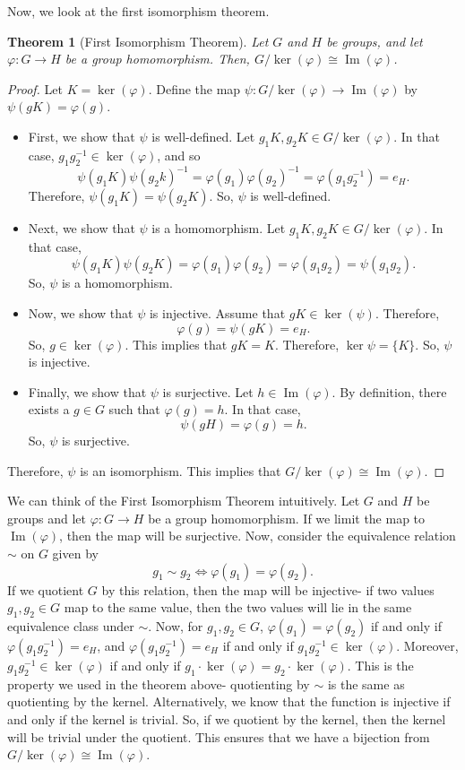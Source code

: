 \documentclass[a4paper, openany]{memoir}
\theoremstyle{definition}
\theoremstyle{plain}
\newtheorem{theorem}[definition]{Theorem}
\begin{document}
Now, we look at the first isomorphism theorem.
\begin{theorem}[First Isomorphism Theorem]
Let $G$ and $H$ be groups, and let $\varphi: G \to H$ be a group homomorphism. Then, $G/\ker (\varphi) \cong \operatorname{Im}(\varphi)$.
\end{theorem}
\begin{proof}
Let $K = \ker (\varphi)$. Define the map $\psi: G/\ker (\varphi) \to \operatorname{Im}(\varphi)$ by $\psi(gK) = \varphi(g)$. 
\begin{itemize}
    \item First, we show that $\psi$ is well-defined. Let $g_1K, g_2K \in G/\ker (\varphi)$. In that case, $g_1g_2^{-1} \in \ker (\varphi)$, and so
    \[\psi(g_1K)\psi(g_2k)^{-1} = \varphi(g_1)\varphi(g_2)^{-1} = \varphi(g_1 g_2^{-1}) = e_H.\]
    Therefore, $\psi(g_1K) = \psi(g_2K)$. So, $\psi$ is well-defined.
    \item Next, we show that $\psi$ is a homomorphism. Let $g_1K, g_2K \in G/\ker (\varphi)$. In that case,
    \[\psi(g_1K)\psi(g_2K) = \varphi(g_1) \varphi(g_2) = \varphi(g_1g_2) = \psi(g_1g_2).\]
    So, $\psi$ is a homomorphism.
    \item Now, we show that $\psi$ is injective. Assume that $gK \in \ker (\psi)$. Therefore, 
    \[\varphi(g) = \psi(gK) = e_H.\]
    So, $g \in \ker (\varphi)$. This implies that $gK = K$. Therefore, $\ker \psi = \{K\}$. So, $\psi$ is injective.
    \item Finally, we show that $\psi$ is surjective. Let $h \in \operatorname{Im}(\varphi)$. By definition, there exists a $g \in G$ such that $\varphi(g) = h$. In that case,
    \[\psi(gH) = \varphi(g) = h.\]
    So, $\psi$ is surjective.
\end{itemize}
Therefore, $\psi$ is an isomorphism. This implies that $G/\ker (\varphi) \cong \operatorname{Im}(\varphi)$.
\end{proof}
\noindent We can think of the First Isomorphism Theorem intuitively. Let $G$ and $H$ be groups and let $\varphi: G \to H$ be a group homomorphism. If we limit the map to $\operatorname{Im}(\varphi)$, then the map will be surjective. Now, consider the equivalence relation $\sim$ on $G$ given by
\[g_1 \sim g_2 \iff \varphi(g_1) = \varphi(g_2).\]
If we quotient $G$ by this relation, then the map will be injective- if two values $g_1, g_2 \in G$ map to the same value, then the two values will lie in the same equivalence class under $\sim$. Now, for $g_1, g_2 \in G$, $\varphi(g_1) = \varphi(g_2)$ if and only if $\varphi(g_1g_2^{-1}) = e_H$, and $\varphi(g_1g_2^{-1}) = e_H$ if and only if $g_1g_2^{-1} \in \ker (\varphi)$. Moreover, $g_1 g_2^{-1} \in \ker (\varphi)$ if and only if $g_1 \cdot \ker (\varphi) = g_2 \cdot \ker (\varphi)$. This is the property we used in the theorem above- quotienting by $\sim$ is the same as quotienting by the kernel. Alternatively, we know that the function is injective if and only if the kernel is trivial. So, if we quotient by the kernel, then the kernel will be trivial under the quotient. This ensures that we have a bijection from $G/\ker (\varphi) \cong \operatorname{Im}(\varphi)$.
\end{document}
